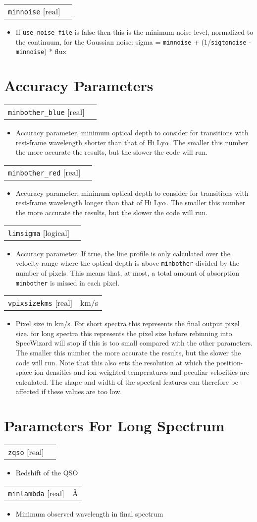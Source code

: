 \documentclass{report}
\makeatletter
\newcommand{\paramdefinition}[3]{
\begin{tabular*}{\textwidth}{l@{\extracolsep{\fill}}r}
		{\tt #1} [{\sc #2}]& #3 \\
\end{tabular*}}
\newcommand{\paramdescription}[1]{
\begin{itemize}
\item #1
\end{itemize}\vspace{0.2cm}}
\makeatother
\begin{document}
\paramdefinition{minnoise}{real}{}
\paramdescription{If {\tt use\_noise\_file} is false then this is the minimum noise level, normalized to the continuum, for the Gaussian noise: sigma = {\tt minnoise} + (1/{\tt sigtonoise} - {\tt minnoise}) * flux}

\section{Accuracy Parameters}

\paramdefinition{minbother\_blue}{real}{}
\paramdescription{Accuracy parameter, minimum optical depth to consider for transitions with rest-frame wavelength shorter than that of H{\sc i} Ly$\alpha$.  The smaller this number the more accurate the results, but the slower the code will run.}

\paramdefinition{minbother\_red}{real}{}
\paramdescription{Accuracy parameter, minimum optical depth to consider for transitions with rest-frame wavelength longer than that of H{\sc i} Ly$\alpha$.  The smaller this number the more accurate the results, but the slower the code will run.}

\paramdefinition{limsigma}{logical}{}
\paramdescription{Accuracy parameter. If true, the line profile is only calculated over the velocity range where the optical depth is above {\tt minbother} divided by the number of pixels. This means that, at most, a total amount of absorption {\tt minbother} is missed in each pixel.}

\paramdefinition{vpixsizekms}{real}{km/s}
\paramdescription{Pixel size in km/s.  For short spectra this represents the final output pixel size.  for long spectra this represents the pixel size before rebinning into. SpecWizard will stop if this is too small compared with the other parameters. The smaller this number the more accurate the results, but the slower the code will run. Note that this also sets the resolution at which the position-space ion densities and ion-weighted temperatures and peculiar velocities are calculated. The shape and width of the spectral features can therefore be affected if these values are too low.}

\section{Parameters For Long Spectrum}
\paramdefinition{zqso}{real}{}
\paramdescription{Redshift of the QSO}

\paramdefinition{minlambda}{real}{\AA{}}
\paramdescription{Minimum observed wavelength in final spectrum}
\end{document}
